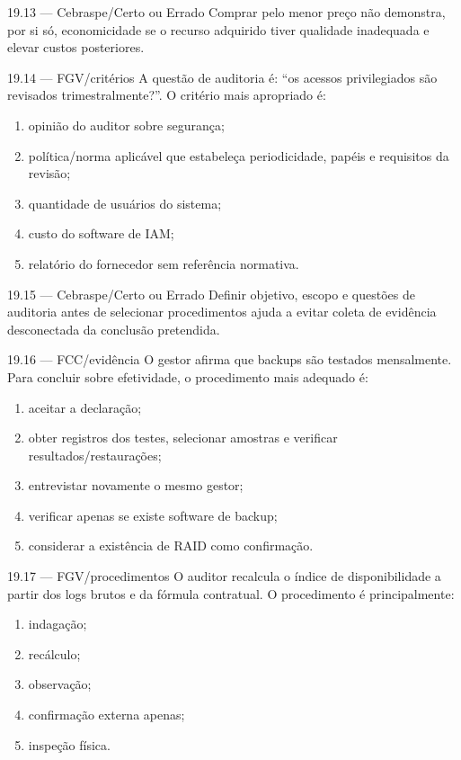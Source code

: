 \begin{questao}{ 19.13 — Cebraspe/Certo ou Errado}
Comprar pelo menor preço não demonstra, por si só, economicidade se o recurso adquirido tiver qualidade inadequada e elevar custos posteriores.
\end{questao}

\begin{questao}{ 19.14 — FGV/critérios}
A questão de auditoria é: ``os acessos privilegiados são revisados trimestralmente?''. O critério mais apropriado é:
\begin{enumerate}[label=\Alph*)]
\item opinião do auditor sobre segurança;
\item política/norma aplicável que estabeleça periodicidade, papéis e requisitos da revisão;
\item quantidade de usuários do sistema;
\item custo do software de IAM;
\item relatório do fornecedor sem referência normativa.
\end{enumerate}
\end{questao}

\begin{questao}{ 19.15 — Cebraspe/Certo ou Errado}
Definir objetivo, escopo e questões de auditoria antes de selecionar procedimentos ajuda a evitar coleta de evidência desconectada da conclusão pretendida.
\end{questao}

\begin{questao}{ 19.16 — FCC/evidência}
O gestor afirma que backups são testados mensalmente. Para concluir sobre efetividade, o procedimento mais adequado é:
\begin{enumerate}[label=\Alph*)]
\item aceitar a declaração;
\item obter registros dos testes, selecionar amostras e verificar resultados/restaurações;
\item entrevistar novamente o mesmo gestor;
\item verificar apenas se existe software de backup;
\item considerar a existência de RAID como confirmação.
\end{enumerate}
\end{questao}

\begin{questao}{ 19.17 — FGV/procedimentos}
O auditor recalcula o índice de disponibilidade a partir dos logs brutos e da fórmula contratual. O procedimento é principalmente:
\begin{enumerate}[label=\Alph*)]
\item indagação;
\item recálculo;
\item observação;
\item confirmação externa apenas;
\item inspeção física.
\end{enumerate}
\end{questao}

